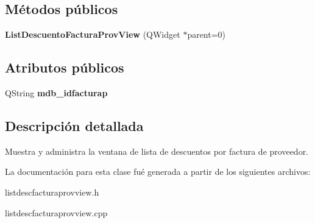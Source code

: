 \subsection*{M\'{e}todos p\'{u}blicos}
\begin{CompactItemize}
\item 
{\bf List\-Descuento\-Factura\-Prov\-View} (QWidget $\ast$parent=0)\label{classListDescuentoFacturaProvView_a0}

\end{CompactItemize}
\subsection*{Atributos p\'{u}blicos}
\begin{CompactItemize}
\item 
QString {\bf mdb\_\-idfacturap}\label{classListDescuentoFacturaProvView_o0}

\end{CompactItemize}


\subsection{Descripci\'{o}n detallada}
Muestra y administra la ventana de lista de descuentos por factura de proveedor. 



La documentaci\'{o}n para esta clase fu\'{e} generada a partir de los siguientes archivos:\begin{CompactItemize}
\item 
listdescfacturaprovview.h\item 
listdescfacturaprovview.cpp\end{CompactItemize}
